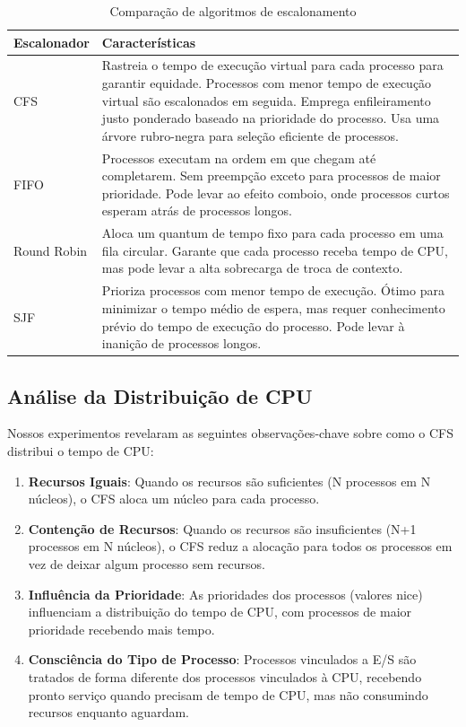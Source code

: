 \documentclass[12pt,a4paper]{article}
\begin{document}
\begin{table}[H]
\centering
\begin{tabular}{|p{2.5cm}|p{11cm}|}
\hline
\textbf{Escalonador} & \textbf{Características} \\
\hline
CFS & Rastreia o tempo de execução virtual para cada processo para garantir equidade. Processos com menor tempo de execução virtual são escalonados em seguida. Emprega enfileiramento justo ponderado baseado na prioridade do processo. Usa uma árvore rubro-negra para seleção eficiente de processos. \\
\hline
FIFO & Processos executam na ordem em que chegam até completarem. Sem preempção exceto para processos de maior prioridade. Pode levar ao efeito comboio, onde processos curtos esperam atrás de processos longos. \\
\hline
Round Robin & Aloca um quantum de tempo fixo para cada processo em uma fila circular. Garante que cada processo receba tempo de CPU, mas pode levar a alta sobrecarga de troca de contexto. \\
\hline
SJF & Prioriza processos com menor tempo de execução. Ótimo para minimizar o tempo médio de espera, mas requer conhecimento prévio do tempo de execução do processo. Pode levar à inanição de processos longos. \\
\hline
\end{tabular}
\caption{Comparação de algoritmos de escalonamento}
\label{tab:scheduler_comparison}
\end{table}

\subsection{Análise da Distribuição de CPU}

Nossos experimentos revelaram as seguintes observações-chave sobre como o CFS distribui o tempo de CPU:

\begin{enumerate}
    \item \textbf{Recursos Iguais}: Quando os recursos são suficientes (N processos em N núcleos), o CFS aloca um núcleo para cada processo.

    \item \textbf{Contenção de Recursos}: Quando os recursos são insuficientes (N+1 processos em N núcleos), o CFS reduz a alocação para todos os processos em vez de deixar algum processo sem recursos.

    \item \textbf{Influência da Prioridade}: As prioridades dos processos (valores nice) influenciam a distribuição do tempo de CPU, com processos de maior prioridade recebendo mais tempo.

    \item \textbf{Consciência do Tipo de Processo}: Processos vinculados a E/S são tratados de forma diferente dos processos vinculados à CPU, recebendo pronto serviço quando precisam de tempo de CPU, mas não consumindo recursos enquanto aguardam.
\end{enumerate}
\end{document}
